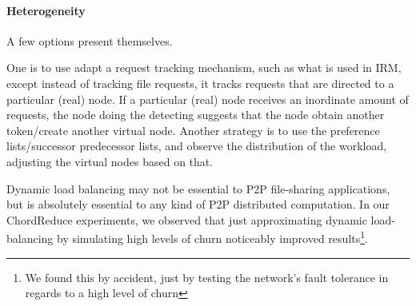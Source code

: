 



\paragraph{Heterogeneity}
\label{subsec:hetero}
A few options present themselves.  %

One is to use adapt a request tracking mechanism, such as what is used in IRM, except instead of tracking file requests, it tracks requests that are directed to a particular (real) node. 
If a particular (real) node receives an inordinate amount of requests, the node doing the detecting suggests that the node obtain another token/create another virtual node.
Another strategy is to use the preference lists/successor predecessor lists, and observe the distribution of the workload, adjusting the virtual nodes based on that. 

Dynamic load balancing may not be essential to P2P file-sharing applications, but is absolutely essential to any kind of P2P distributed computation.
In our ChordReduce experiments, we observed that just approximating dynamic load-balancing by simulating high levels of churn noticeably improved results\footnote{We found this by accident, just by testing the network's fault tolerance in regards to a high level of churn}.




